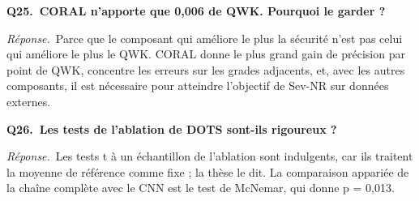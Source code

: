 \documentclass[11pt,a4paper]{article}
\begin{document}
\textbf{Q25.~CORAL n'apporte que 0,006 de QWK. Pourquoi le garder ?}\par\nopagebreak
\textit{Réponse.}~Parce que le composant qui améliore le plus la sécurité n'est pas celui qui améliore le plus le QWK. CORAL donne le plus grand gain de précision par point de QWK, concentre les erreurs sur les grades adjacents, et, avec les autres composants, il est nécessaire pour atteindre l'objectif de Sev-NR sur données externes.\par\medskip
\textbf{Q26.~Les tests de l'ablation de DOTS sont-ils rigoureux ?}\par\nopagebreak
\textit{Réponse.}~Les tests t à un échantillon de l'ablation sont indulgents, car ils traitent la moyenne de référence comme fixe ; la thèse le dit. La comparaison appariée de la chaîne complète avec le CNN est le test de McNemar, qui donne p = 0,013.\par\medskip
\end{document}
